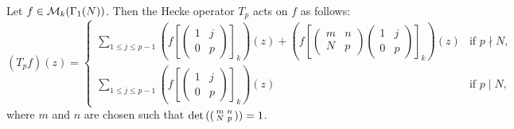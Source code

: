       \begin{proposition}\label{prop:explicit_description_of_Hecke_operators}
        Let $f \in \mathcal{M}_{k}(\Gamma_{1}(N))$. Then the Hecke operator $T_{p}$ acts on $f$ as follows:
        \[
          (T_{p}f)(z) = \begin{cases} \displaystyle\sum_{1 \le j \le p-1}\left(f\left[\begin{pmatrix} 1 & j \\ 0 & p \end{pmatrix}\right]_{k}\right)(z)+\left(f\left[\begin{pmatrix} m & n \\ N & p \end{pmatrix}\begin{pmatrix} 1 & j \\ 0 & p \end{pmatrix}\right]_{k}\right)(z) & \text{if $p \nmid N$}, \\ \displaystyle\sum_{1 \le j \le p-1}\left(f\left[\begin{pmatrix} 1 & j \\ 0 & p \end{pmatrix}\right]_{k}\right)(z) & \text{if $p \mid N$}, \end{cases}
        \]
        where $m$ and $n$ are chosen such that $\det\left(\begin{psmallmatrix} m & n \\ N & p \end{psmallmatrix}\right) = 1$.
      \end{proposition}

